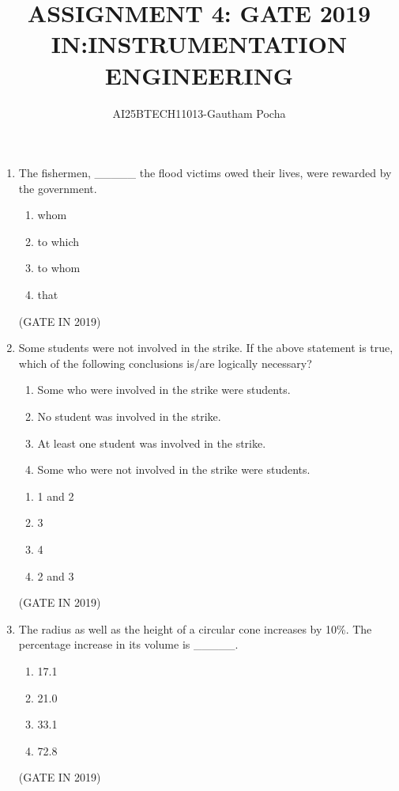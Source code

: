 \documentclass[journal]{IEEEtran}
\begin{document}
\title{
ASSIGNMENT 4: GATE 2019 \\
IN:INSTRUMENTATION ENGINEERING}
\author{AI25BTECH11013-Gautham Pocha}
\maketitle
\renewcommand{\thefigure}{\theenumi}
\renewcommand{\thetable}{\theenumi} 

\begin{enumerate}
\item The fishermen, \_\_\_\_\_ the flood victims owed their lives, were rewarded by the government.
\begin{multicols}{4}
\begin{enumerate}
\item whom
\item to which
\item to whom
\item that
\end{enumerate}
\end{multicols} \hfill(GATE IN 2019)

\item Some students were not involved in the strike. If the above statement is true, which of the following conclusions is/are logically necessary?
\begin{enumerate}
\item Some who were involved in the strike were students.
\item No student was involved in the strike.
\item At least one student was involved in the strike.
\item Some who were not involved in the strike were students.
\end{enumerate}
\begin{multicols}{4}
\begin{enumerate}
\item 1 and 2
\item 3
\item 4
\item 2 and 3
\end{enumerate}
\end{multicols} \hfill(GATE IN 2019)

\item The radius as well as the height of a circular cone increases by 10\%. The percentage increase in its volume is \_\_\_\_\_.
\begin{multicols}{4}
\begin{enumerate}
\item 17.1
\item 21.0
\item 33.1
\item 72.8
\end{enumerate}
\end{multicols} \hfill(GATE IN 2019)


\end{enumerate}
\end{document}
